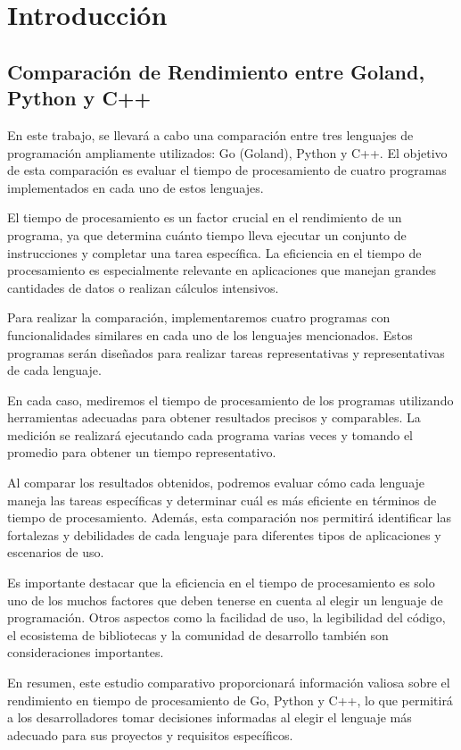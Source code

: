\section{Introducción}


\subsection{Comparación de Rendimiento entre Goland, Python y C++}
En este trabajo, se llevará a cabo una comparación entre tres lenguajes de programación ampliamente utilizados: Go (Goland), Python y C++. El objetivo de esta comparación es evaluar el tiempo de procesamiento de cuatro programas implementados en cada uno de estos lenguajes.

El tiempo de procesamiento es un factor crucial en el rendimiento de un programa, ya que determina cuánto tiempo lleva ejecutar un conjunto de instrucciones y completar una tarea específica. La eficiencia en el tiempo de procesamiento es especialmente relevante en aplicaciones que manejan grandes cantidades de datos o realizan cálculos intensivos.

Para realizar la comparación, implementaremos cuatro programas con funcionalidades similares en cada uno de los lenguajes mencionados. Estos programas serán diseñados para realizar tareas representativas y representativas de cada lenguaje.

En cada caso, mediremos el tiempo de procesamiento de los programas utilizando herramientas adecuadas para obtener resultados precisos y comparables. La medición se realizará ejecutando cada programa varias veces y tomando el promedio para obtener un tiempo representativo.

Al comparar los resultados obtenidos, podremos evaluar cómo cada lenguaje maneja las tareas específicas y determinar cuál es más eficiente en términos de tiempo de procesamiento. Además, esta comparación nos permitirá identificar las fortalezas y debilidades de cada lenguaje para diferentes tipos de aplicaciones y escenarios de uso.

Es importante destacar que la eficiencia en el tiempo de procesamiento es solo uno de los muchos factores que deben tenerse en cuenta al elegir un lenguaje de programación. Otros aspectos como la facilidad de uso, la legibilidad del código, el ecosistema de bibliotecas y la comunidad de desarrollo también son consideraciones importantes.

En resumen, este estudio comparativo proporcionará información valiosa sobre el rendimiento en tiempo de procesamiento de Go, Python y C++, lo que permitirá a los desarrolladores tomar decisiones informadas al elegir el lenguaje más adecuado para sus proyectos y requisitos específicos.
